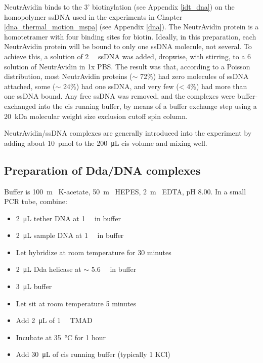 NeutrAvidin binds to the 3' biotinylation (see Appendix \ref{idt_dna}) on the homopolymer ssDNA used in the experiments in Chapter \ref{dna_thermal_motion_mspa} (see Appendix \ref{dna}).  The NeutrAvidin protein is a homotetramer with four binding sites for biotin.  Ideally, in this preparation, each NeutrAvidin protein will be bound to only one ssDNA molecule, not several.  To achieve this, a solution of \SI{2}{\micro\Molar} ssDNA was added, dropwise, with stirring, to a \SI{6}{\micro\Molar} solution of NeutrAvidin in \num{1}x PBS.  The result was that, according to a Poisson distribution, most NeutrAvidin proteins ($\sim$ \num{72}\%) had zero molecules of ssDNA attached, some ($\sim$ \num{24}\%) had one ssDNA, and very few (< \num{4}\%) had more than one ssDNA bound.  Any free ssDNA was removed, and the complexes were buffer-exchanged into the cis running buffer, by means of a buffer exchange step using a \SI{20}{\kilo\dalton} molecular weight size exclusion cutoff spin column.

NeutrAvidin/ssDNA complexes are generally introduced into the experiment by adding about \SI{10}{\pico\mol} to the \SI{200}{\micro\liter} cis volume and mixing well.

\subsection{Preparation of Dda/DNA complexes}

Buffer is \SI{100}{\m\Molar} K-acetate, \SI{50}{\m\Molar} HEPES, \SI{2}{\m\Molar} EDTA, pH \num{8.00}.  In a small PCR tube, combine:

\begin{itemize}
\item \SI{2}{\micro\liter} tether DNA at \SI{1}{\micro\Molar} in buffer
\item \SI{2}{\micro\liter} sample DNA at \SI{1}{\micro\Molar} in buffer
\item Let hybridize at room temperature for \num{30} minutes
\item \SI{2}{\micro\liter} Dda helicase at $\sim$ \SI{5.6}{\micro\Molar} in buffer
\item \SI{3}{\micro\liter} buffer
\item Let sit at room temperature \num{5} minutes
\item Add \SI{2}{\micro\liter} of \SI{1}{\milli\Molar} TMAD
\item Incubate at \SI{35}{\celsius} for \num{1} hour
\item Add \SI{30}{\micro\liter} of cis running buffer (typically \SI{1}{\Molar} KCl)
\end{itemize}

